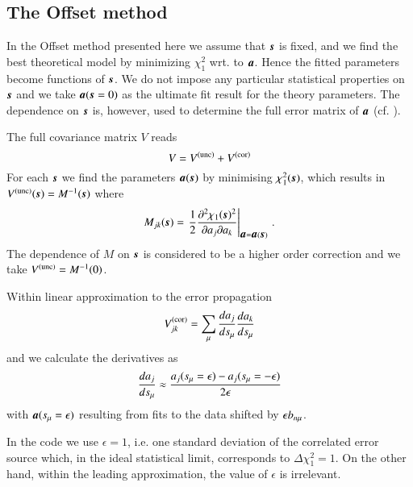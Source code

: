 \subsection{The Offset method}

In the Offset method presented here we assume that $\mb\rs$ is fixed, 
and we find the best theoretical model by minimizing
$\chi_1^2$ wrt. to $\mb a$. 
Hence the fitted parameters become functions
of $\mb\rs$. %
We do not impose any particular statistical properties on $\mb\rs$ 
and we take $\mb a(\mb\rs=0)$ as the ultimate fit result for the theory parameters. 
The dependence on $\mb\rs$ is, however, used to determine
the full error matrix of $\mb a$ (cf. \cite{Pascaud:1995qs}).

The full covariance matrix $V$ reads
\begin{equation}
\label{eq:Cv-full}
V = V^{\mathrm{(unc)}} + V^{\mathrm{(cor)}}
\end{equation}
For each $\mb\rs$ we find the parameters $\mb a(\mb \rs)$ by minimising $\chi_1^2(\mb \rs)$, which results in
$\Vstat(\mb \rs) = M^{-1}(\mb \rs)$ where
\begin{equation}
M_{jk}(\mb \rs)
= \left.
{\frac12} \frac{\partial^2\chi_1(\mb \rs)^2}{\partial a_j \partial a_k}\right\vert_{\mb a = \mb a(\mb \rs)}
\,.
\end{equation}
The dependence of $M$ on $\mb \rs$ is considered to be a higher order correction
and we take $V^{\mathrm{(unc)}} = M^{-1}(0)$.

Within linear approximation to the error propagation
\begin{equation}
\label{eq:Vsysp}
V^{\mathrm{(cor)}}_{jk} = \sum_\mu \frac{da_j}{ds_\mu} \frac{da_k}{ds_\mu}
\end{equation} 
and we calculate the derivatives as
\begin{equation}
\frac{da_j}{ds_\mu} \approx
\frac{a_j(s_\mu=\epsilon) - a_j(s_\mu=-\epsilon)}{2\epsilon}
\end{equation}
with $\mb a(\rs_\mu=\epsilon)$ resulting from
fits to the data shifted by $\epsilon b_{n\mu}$.

In the code we use $\epsilon=1$, i.e. one standard deviation of
the correlated error source which, in the ideal statistical limit, corresponds to 
$\Delta\chi_1^2 = 1$.
On the other hand, within the leading approximation, the value of $\epsilon$ is irrelevant.

